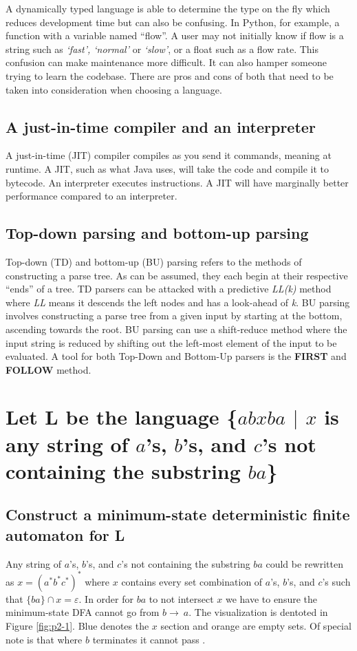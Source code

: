 \documentclass{article}
\begin{document}
A dynamically typed language is able to determine the type on the fly which 
reduces development time but can also be confusing. In Python, for example, a 
function with a variable named ``flow''. A user may not initially know if flow 
is a string such as \textit{`fast', `normal'} or \textit{`slow'}, or a float 
such as a flow rate. This confusion can make maintenance more difficult. It can 
also hamper someone trying to learn the codebase. There are pros and cons of 
both that need to be taken into consideration when choosing a language.

\subsection[JIT Compiler and Interpreters]{A just-in-time compiler and an 
interpreter}
A just-in-time (JIT) compiler compiles as you send it commands, meaning at 
runtime. A JIT, such as what Java uses, will take the code and compile it to 
bytecode. An interpreter executes instructions. A JIT will have marginally 
better performance compared to an interpreter.

\subsection[Top-Down and Bottom-Up Parsing]{Top-down parsing and bottom-up 
parsing}
Top-down (TD) and bottom-up (BU) parsing refers to the methods of constructing 
a parse tree. As can be assumed, they each begin at their respective ``ends'' 
of a tree. TD parsers can be attacked with a predictive \textit{LL(k)} method 
where \textit{LL} means it descends the left nodes and has a look-ahead of 
\textit{k}. BU parsing involves constructing a parse tree from a given input by 
starting at the bottom, ascending towards the root. BU parsing can use a 
shift-reduce method where the input string is reduced by shifting out the 
left-most element of the input to be evaluated. A tool for both Top-Down and 
Bottom-Up parsers is the \textbf{FIRST} and \textbf{FOLLOW} method.




\newpage
\section[Problem 2]{Let L be the language \{$abxba$ $\vert$ $x$ is any string 
of $a$'s, $b$'s, and $c$'s not containing the substring $ba$\}}
\subsection[Minimum-State DFA]{Construct a minimum-state deterministic finite 
automaton for L}
Any string of $a$'s, $b$'s, and $c$'s not containing the substring $ba$ could 
be rewritten as $x = (a^\ast b^\ast c^\ast)^\ast$ where $x$ contains every set 
combination of $a$'s, $b$'s, and $c$'s such that $\{ba\} \cap x = \varepsilon$. 
In order for $ba$ to not intersect $x$ we have to ensure the minimum-state DFA 
cannot go from $b \to\ a$. The visualization is dentoted in Figure \ref{fig:p2-1}. 
Blue denotes the $x$ section and orange are empty sets. Of special note is that 
where $b$ terminates it cannot pass \varepsilon.
\end{document}
